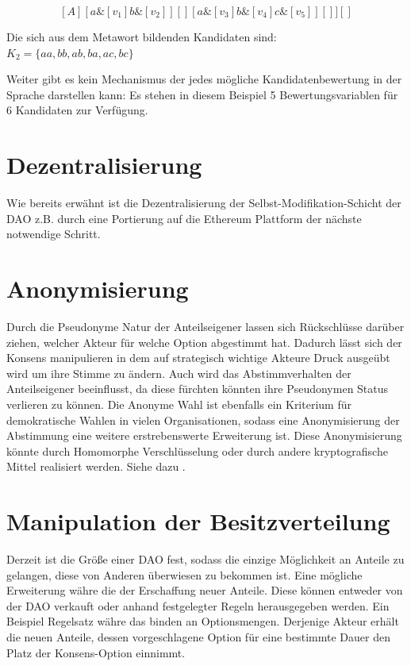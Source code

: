 \documentclass[a4paper,12pt]{report}
\begin{document}
\[ [A][ a\&[v_1]b\&[v_2] ][][ a\&[v_3]b\&[v_4]c\&[v_5] ][] ][] \] 


Die sich aus dem Metawort bildenden Kandidaten sind: $K_2=\{ aa, bb, ab, ba, ac, bc \}$

Weiter gibt es kein Mechanismus der jedes mögliche Kandidatenbewertung in der Sprache darstellen kann: Es stehen in diesem Beispiel 5 Bewertungsvariablen für 6 Kandidaten zur Verfügung. 

\section{Dezentralisierung}
Wie bereits erwähnt ist die Dezentralisierung der Selbst-Modifikation-Schicht der DAO z.B. durch eine Portierung auf die Ethereum Plattform der nächste notwendige Schritt.

\section{Anonymisierung}
Durch die Pseudonyme Natur der Anteilseigener lassen sich Rückschlüsse darüber ziehen, welcher Akteur für welche Option abgestimmt hat. Dadurch lässt sich der Konsens manipulieren in dem auf strategisch wichtige Akteure Druck ausgeübt wird um ihre Stimme zu ändern. Auch wird das Abstimmverhalten der Anteilseigener beeinflusst, da diese fürchten könnten ihre Pseudonymen Status verlieren zu können. Die Anonyme Wahl ist ebenfalls ein Kriterium für demokratische Wahlen in vielen Organisationen, sodass eine Anonymisierung der Abstimmung eine weitere erstrebenswerte Erweiterung ist. Diese Anonymisierung könnte durch Homomorphe Verschlüsselung\cite{Gentry2009} oder durch andere kryptografische Mittel realisiert werden. Siehe dazu \cite{Fouard}.

\section{Manipulation der Besitzverteilung}
Derzeit ist die Größe einer DAO fest, sodass die einzige Möglichkeit an Anteile zu gelangen, diese von Anderen überwiesen zu bekommen ist. Eine mögliche Erweiterung währe die der Erschaffung neuer Anteile. Diese können entweder von der DAO verkauft oder anhand festgelegter Regeln herausgegeben werden. Ein Beispiel Regelsatz währe das binden an Optionsmengen. Derjenige Akteur erhält die neuen Anteile, dessen vorgeschlagene Option für eine bestimmte Dauer den Platz der Konsens-Option einnimmt.





\newpage

\nocite{Otto}
\nocite{Vasant2015}



\end{document}
